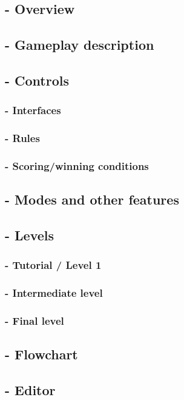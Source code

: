 \subsection{- Overview}

\subsection{- Gameplay description}

\subsection{- Controls}
\subsubsection{- Interfaces}
\subsubsection{- Rules}
\subsubsection{- Scoring/winning conditions}

\subsection{- Modes and other features}

\subsection{- Levels}
\subsubsection{- Tutorial / Level 1}
\subsubsection{- Intermediate level}
\subsubsection{- Final level}

\subsection{- Flowchart}

\subsection{- Editor}

